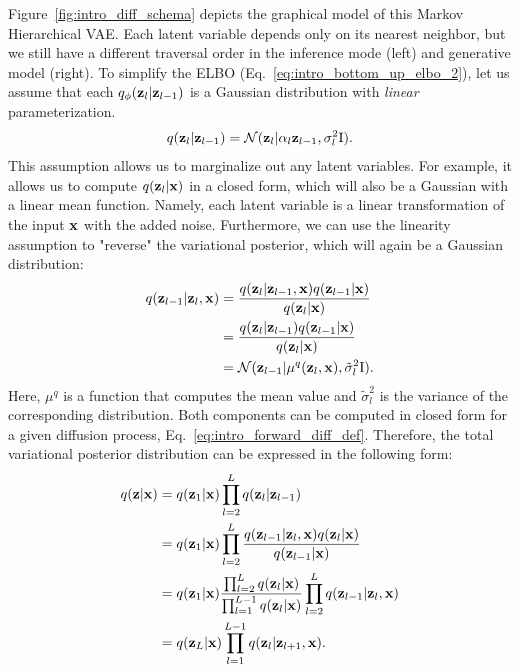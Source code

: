Figure~\ref{fig:intro_diff_schema} depicts the graphical model of this Markov Hierarchical VAE. Each latent variable depends only on its nearest neighbor, but we still have a different traversal order in the inference mode (left) and generative model (right). To simplify the ELBO (Eq.~\ref{eq:intro_bottom_up_elbo_2}), let us assume that each $q_{\phi}({\mathbf{z}}_l|{\mathbf{z}}_{l-1})$ is a Gaussian distribution with \textit{linear} parameterization. 
\begin{equation}
\begin{aligned}\label{eq:intro_forward_diff_def}
    q(\rvz_l|\rvz_{l-1}) = \mathcal{N}(\rvz_l | \alpha_l \rvz_{l-1}, \sigma_l^2\text{I}).
\end{aligned}
\end{equation}
This assumption allows us to marginalize out any latent variables. For example, it allows us to compute $q({\mathbf{z}}_l|{\mathbf{x}})$ in a closed form, which will also be a Gaussian with a linear mean function. Namely, each latent variable is a linear transformation of the input ${\mathbf{x}}$ with the added noise.
 Furthermore, we can use the linearity assumption to "reverse" the variational posterior, which will again be a Gaussian distribution:
\begin{align}
q(\rvz_{l-1} |\rvz_l, \rvx) &= \frac{q(\rvz_l|\rvz_{l-1}, \rvx)q(\rvz_{l-1}|\rvx)}{q(\rvz_l|\rvx)}\\
&= \frac{q(\rvz_l|\rvz_{l-1})q(\rvz_{l-1}|\rvx)}{q(\rvz_l|\rvx)} \\
& = \mathcal{N}(\rvz_{l-1} | \mu^q(\rvz_l, \rvx), \tilde{\sigma}^2_l\text{I}).\label{eq:intro_diff_q_form}
\end{align}
\newline
Here, $\mu^q$ is a function that computes the mean value and $\tilde{\sigma}^2_l$ is the variance of the corresponding distribution. Both components can be computed in closed form for a given diffusion process, Eq.~\ref{eq:intro_forward_diff_def}. Therefore, the total variational posterior distribution can be expressed in the following form:
\begin{align}
    q({\mathbf{z}}|{\mathbf{x}}) &= q({\mathbf{z}}_1|{\mathbf{x}})\prod_{l=2}^L q({\mathbf{z}}_l|{\mathbf{z}}_{l-1}) \\
    & = q({\mathbf{z}}_1|{\mathbf{x}})\prod_{l=2}^L \frac{q({\mathbf{z}}_{l-1} |{\mathbf{z}}_l, {\mathbf{x}})q({\mathbf{z}}_l|{\mathbf{x}})}{q({\mathbf{z}}_{l-1}|{\mathbf{x}})}\\
    & = q({\mathbf{z}}_1|{\mathbf{x}})  \frac{\prod_{l=2}^L q({\mathbf{z}}_l|{\mathbf{x}})}{\prod_{l=1}^{L-1} q({\mathbf{z}}_{l}|{\mathbf{x}})}\prod_{l=2}^L q({\mathbf{z}}_{l-1} |{\mathbf{z}}_l, {\mathbf{x}})\\
    & = q({\mathbf{z}}_L|{\mathbf{x}})\prod_{l=1}^{L-1} q({\mathbf{z}}_{l} |{\mathbf{z}}_{l+1}, {\mathbf{x}}).
\end{align}
